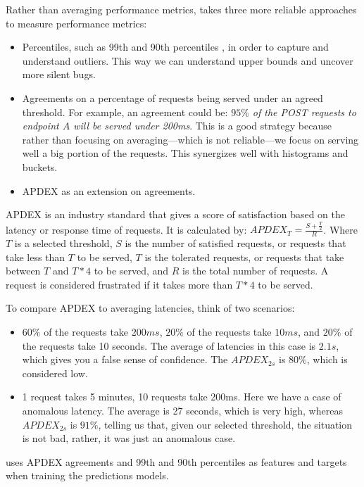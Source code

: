 Rather than averaging performance metrics, \projectname{} takes three more reliable approaches to measure performance metrics:

\begin{itemize}
  \item Percentiles, such as 99th and 90th percentiles , in order to capture and understand outliers. This way we can understand upper bounds and uncover more silent bugs.
  \item Agreements on a percentage of requests being served under an agreed threshold. For example, an agreement could be: \textit{$95\%$ of the POST requests to endpoint $A$ will be served under 200ms}. This is a good strategy because rather than focusing on averaging---which is not reliable---we focus on serving well a big portion of the requests. This synergizes well with histograms and buckets.
  \item APDEX \cite{Apdex} as an extension on agreements.
\end{itemize}

APDEX is an industry standard that gives a score of satisfaction based on the latency or response time of requests. It is calculated by: $APDEX_T = \frac{S + \frac{T}{2}}{R}$. Where $T$ is a selected threshold, $S$ is the number of satisfied requests, or requests that take less than $T$ to be served, $T$ is the tolerated requests, or requests that take between $T$ and $T*4$ to be served, and $R$ is the total number of requests. A request is considered frustrated if it takes more than $T*4$ to be served.

To compare APDEX to averaging latencies, think of two scenarios:

\begin{itemize}
  \item $60\%$ of the requests take $200ms$, $20\%$ of the requests take $10ms$, and $20\%$ of the requests take 10 seconds. The average of latencies in this case is $2.1s$, which gives you a false sense of confidence. The $APDEX_{2s}$ is $80\%$, which is considered low.
  \item 1 request takes 5 minutes, 10 requests take 200ms. Here we have a case of anomalous latency. The average is 27 seconds, which is very high, whereas $APDEX_{2s}$ is $91\%$, telling us that, given our selected threshold, the situation is not bad, rather, it was just an anomalous case.
  
\end{itemize}

\projectname{} uses APDEX agreements and 99th and 90th percentiles as features and targets when training the predictions models.


